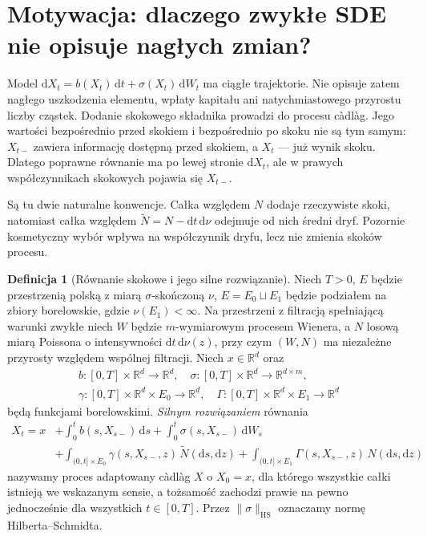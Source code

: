 \documentclass[11pt,a4paper,oneside]{report}
\numberwithin{equation}{chapter}
\theoremstyle{plain}
\theoremstyle{definition}
\newtheorem{definicja}{Definicja}[chapter]
\theoremstyle{remark}
\newcommand{\R}{\mathbb{R}}
\newcommand{\dd}{\mathrm{d}}
\begin{document}
\section{Motywacja: dlaczego zwykłe SDE nie opisuje nagłych zmian?}

Model $\dd X_t=b(X_t)\,\dd t+\sigma(X_t)\,\dd W_t$ ma ciągłe
trajektorie. Nie opisuje zatem nagłego uszkodzenia elementu, wpłaty
kapitału ani natychmiastowego przyrostu liczby cząstek. Dodanie
skokowego składnika prowadzi do procesu càdlàg. Jego wartości
bezpośrednio przed skokiem i bezpośrednio po skoku nie są tym samym:
$X_{t-}$ zawiera informację dostępną przed skokiem, a $X_t$ ---
już wynik skoku. Dlatego poprawne równanie ma po lewej stronie
$\dd X_t$, ale w prawych współczynnikach skokowych pojawia się
$X_{t-}$.

Są tu dwie naturalne konwencje. Całka względem $N$ dodaje
rzeczywiste skoki, natomiast całka względem
$\widetilde N=N-\dd t\,\dd\nu$ odejmuje od nich średni dryf.
Pozornie kosmetyczny wybór wpływa na współczynnik dryfu, lecz
nie zmienia skoków procesu.

\begin{definicja}[Równanie skokowe i jego silne rozwiązanie]
\label{def:jump-sde}
Niech $T>0$, $E$ będzie przestrzenią polską z miarą
$\sigma$-skończoną $\nu$, $E=E_0\sqcup E_1$ będzie podziałem
na zbiory borelowskie, gdzie $\nu(E_1)<\infty$.
Na przestrzeni z filtracją spełniającą warunki zwykłe niech $W$
będzie $m$-wymiarowym procesem Wienera, a $N$ losową miarą
Poissona o intensywności $\dd t\,\dd\nu(z)$, przy czym
$(W,N)$ ma niezależne przyrosty względem wspólnej filtracji.
Niech $x\in\R^d$ oraz
\[
\begin{gathered}
b:[0,T]\times\R^d\to\R^d,\quad
\sigma:[0,T]\times\R^d\to\R^{d\times m},\\
\gamma:[0,T]\times\R^d\times E_0\to\R^d,\quad
\Gamma:[0,T]\times\R^d\times E_1\to\R^d
\end{gathered}
\]
będą funkcjami borelowskimi. \emph{Silnym rozwiązaniem} równania
\[
\begin{split}
X_t=x&+\int_0^t b(s,X_{s-})\,\dd s
 +\int_0^t\sigma(s,X_{s-})\,\dd W_s\\
&+\int_{(0,t]\times E_0}\gamma(s,X_{s-},z)\,\widetilde N(\dd s,\dd z)
 +\int_{(0,t]\times E_1}\Gamma(s,X_{s-},z)\,N(\dd s,\dd z)
\end{split}
\tag{13.1}\label{eq:jump-sde}
\]
nazywamy proces adaptowany càdlàg $X$ o $X_0=x$, dla którego
wszystkie całki istnieją we wskazanym sensie, a tożsamość zachodzi
prawie na pewno jednocześnie dla wszystkich $t\in[0,T]$.
Przez $\|\sigma\|_{\mathrm{HS}}$ oznaczamy normę Hilberta--Schmidta.
\end{definicja}
\end{document}
